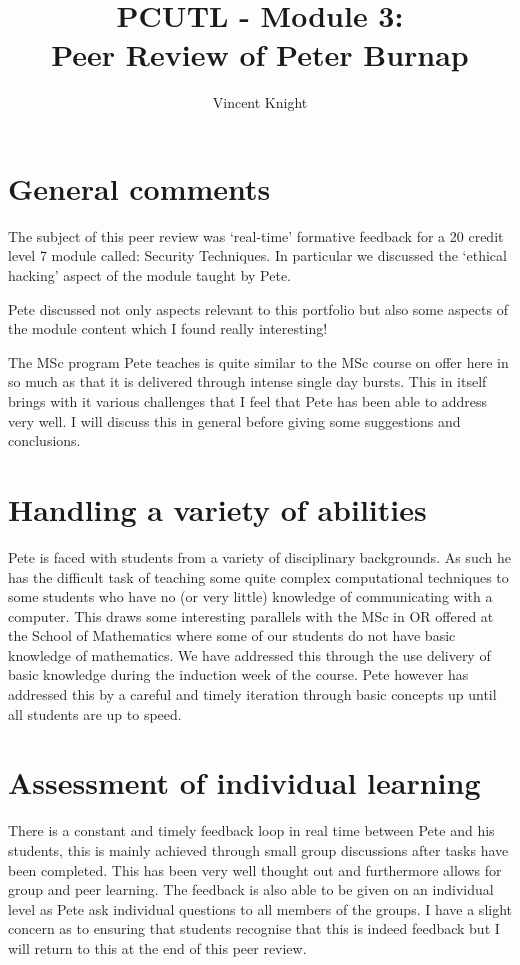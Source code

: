 \documentclass{article}
\title{PCUTL - Module 3:\\ Peer Review of Peter Burnap}
\author{Vincent Knight}
\date{}
\begin{document}
\maketitle

\section{General comments}

The subject of this peer review was `real-time' formative feedback for a 20 credit level 7 module called: Security Techniques. In particular we discussed the `ethical hacking' aspect of the module taught by Pete.

Pete discussed not only aspects relevant to this portfolio but also some aspects of the module content which I found really interesting!

The MSc program Pete teaches is quite similar to the MSc course on offer here in so much as that it is delivered through intense single day bursts. This in itself brings with it various challenges that I feel that Pete has been able to address very well. I will discuss this in general before giving some suggestions and conclusions.

\section{Handling a variety of abilities}

Pete is faced with students from a variety of disciplinary backgrounds. As such he has the difficult task of teaching some quite complex computational techniques to some students who have no (or very little) knowledge of communicating with a computer. This draws some interesting parallels with the MSc in OR offered at the School of Mathematics where some of our students do not have basic knowledge of mathematics. We have addressed this through the use delivery of basic knowledge during the induction week of the course. Pete however has addressed this by a careful and timely iteration through basic concepts up until all students are up to speed.

\section{Assessment of individual learning}

There is a constant and timely feedback loop in real time between Pete and his students, this is mainly achieved through small group discussions after tasks have been completed. This has been very well thought out and furthermore allows for group and peer learning. The feedback is also able to be given on an individual level as Pete ask individual questions to all members of the groups. I have a slight concern as to ensuring that students recognise that this is indeed feedback but I will return to this at the end of this peer review.
\end{document}
